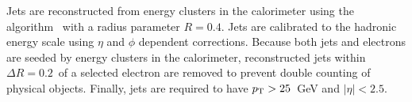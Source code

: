 Jets are reconstructed from energy clusters in the calorimeter using the {\it \AKT} algorithm~\cite{antikt}
with a radius parameter $R = 0.4$.
Jets are calibrated to the hadronic energy scale using $\eta$ and $\phi$ dependent corrections.
Because both jets and electrons are seeded by energy clusters in the calorimeter,
reconstructed jets within $\Delta R=0.2$\ of a selected electron are removed to
prevent double counting of physical objects.
Finally, jets are required to have $p_{\mathrm{T}}>25$~GeV and $|\eta|<2.5$.






